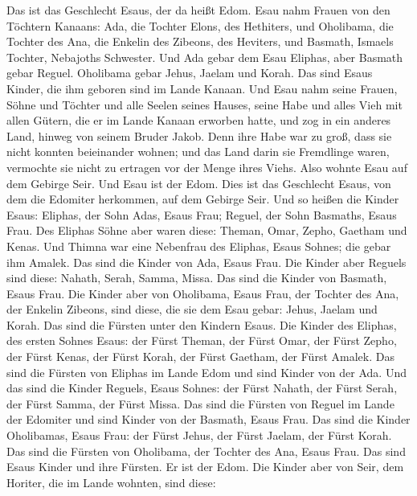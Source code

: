  Das ist das Geschlecht Esaus, der da heißt Edom.
 Esau nahm Frauen von den Töchtern Kanaans: Ada, die
Tochter Elons, des Hethiters, und Oholibama, die Tochter des Ana, die
Enkelin des Zibeons, des Heviters,  und Basmath, Ismaels
Tochter, Nebajoths Schwester.  Und Ada gebar dem Esau
Eliphas, aber Basmath gebar Reguel.  Oholibama gebar
Jehus, Jaelam und Korah. Das sind Esaus Kinder, die ihm geboren sind im
Lande Kanaan.  Und Esau nahm seine Frauen, Söhne und
Töchter und alle Seelen seines Hauses, seine Habe und alles Vieh mit
allen Gütern, die er im Lande Kanaan erworben hatte, und zog in ein
anderes Land, hinweg von seinem Bruder Jakob.  Denn ihre
Habe war zu groß, dass sie nicht konnten beieinander wohnen; und das
Land darin sie Fremdlinge waren, vermochte sie nicht zu ertragen vor der
Menge ihres Viehs.  Also wohnte Esau auf dem Gebirge Seir.
Und Esau ist der Edom.  Dies ist das Geschlecht Esaus, von
dem die Edomiter herkommen, auf dem Gebirge Seir.  Und so
heißen die Kinder Esaus: Eliphas, der Sohn Adas, Esaus Frau; Reguel, der
Sohn Basmaths, Esaus Frau.  Des Eliphas Söhne aber waren
diese: Theman, Omar, Zepho, Gaetham und Kenas.  Und
Thimna war eine Nebenfrau des Eliphas, Esaus Sohnes; die gebar ihm
Amalek. Das sind die Kinder von Ada, Esaus Frau.  Die
Kinder aber Reguels sind diese: Nahath, Serah, Samma, Missa. Das sind
die Kinder von Basmath, Esaus Frau.  Die Kinder aber von
Oholibama, Esaus Frau, der Tochter des Ana, der Enkelin Zibeons, sind
diese, die sie dem Esau gebar: Jehus, Jaelam und Korah. 
Das sind die Fürsten unter den Kindern Esaus. Die Kinder des Eliphas,
des ersten Sohnes Esaus: der Fürst Theman, der Fürst Omar, der Fürst
Zepho, der Fürst Kenas,  der Fürst Korah, der Fürst
Gaetham, der Fürst Amalek. Das sind die Fürsten von Eliphas im Lande
Edom und sind Kinder von der Ada.  Und das sind die
Kinder Reguels, Esaus Sohnes: der Fürst Nahath, der Fürst Serah, der
Fürst Samma, der Fürst Missa. Das sind die Fürsten von Reguel im Lande
der Edomiter und sind Kinder von der Basmath, Esaus Frau.
 Das sind die Kinder Oholibamas, Esaus Frau: der Fürst
Jehus, der Fürst Jaelam, der Fürst Korah. Das sind die Fürsten von
Oholibama, der Tochter des Ana, Esaus Frau.  Das sind
Esaus Kinder und ihre Fürsten. Er ist der Edom.  Die
Kinder aber von Seir, dem Horiter, die im Lande wohnten, sind diese:

